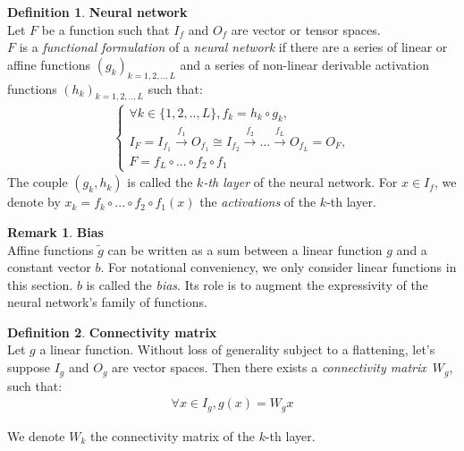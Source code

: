 \documentclass{article}
\theoremstyle{definition}
\newtheorem{definition}{Definition}[section]
\newtheorem{remark}{Remark}
\newcommand{\ovec}{}
\begin{document}
\begin{definition}\textbf{Neural network}\\
\label{nndef}
{Let $F$ be a function such that $I_f$ and $O_f$ are vector or tensor spaces.\\
$F$ is a \emph{functional formulation} of a \emph{neural network} if there are a series of linear or affine functions $(g_k)_{k=1,2,..,L}$ and a series of non-linear derivable activation functions $(h_k)_{k=1,2,..,L}$ such that:
\begin{gather*}
\left\{
  \begin{array}{l}
    \forall k \in \{1,2,..,L\}, f_k = h_k \circ g_k, \\
    I_F = I_{f_1} \xrightarrow{f_1} O_{f_1} \cong I_{f_2} \xrightarrow{f_2} \dots \xrightarrow{f_L} O_{f_L} = O_F, \\
    F = f_{L} \circ ... \circ f_{2} \circ f_1
  \end{array}
\right.
\end{gather*}
The couple $(g_k, h_k)$ is called the \emph{$k$-th layer} of the neural network.
For $\ovec{x} \in I_f$, we denote by $\ovec{x_k} = f_k \circ ... \circ f_{2} \circ f_1 (\ovec{x})$ the \emph{activations} of the $k$-th layer.
}
\end{definition}

\begin{remark}\textbf{Bias}\\
Affine functions $\widetilde{g}$ can be written as a sum between a linear function $g$ and a constant vector $b$. For notational conveniency, we only consider linear functions in this section. $b$ is called the \emph{bias}. Its role is to augment the expressivity of the neural network's family of functions.
\end{remark}

\begin{definition}\textbf{Connectivity matrix}\\
Let $g$ a linear function. Without loss of generality subject to a flattening, let's suppose $I_g$ and $O_g$ are vector spaces. Then there exists a \emph{connectivity matrix}~$W_g$, such that:
\begin{gather*}
\forall \ovec{x} \in I_g, g(\ovec{x}) = W_g\ovec{x}
\end{gather*}
\end{definition}
We denote $W_k$ the connectivity matrix of the $k$-th layer.
\end{document}

